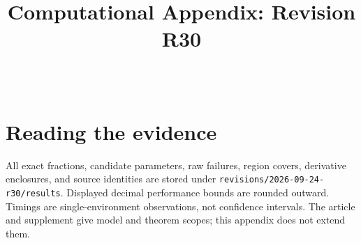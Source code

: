 

\begin{frontmatter}
\title{Computational Appendix: Revision R30}
\begin{aug}\author[id=au1,addressref={add1}]{~}\address[id=add1]{}\end{aug}
\end{frontmatter}
\section{Reading the evidence}
All exact fractions, candidate parameters, raw failures, region covers, derivative enclosures, and source identities are stored under \texttt{revisions/2026-09-24-r30/results}. Displayed decimal performance bounds are rounded outward. Timings are single-environment observations, not confidence intervals. The article and supplement give model and theorem scopes; this appendix does not extend them.





\clearpage
\clearpage

